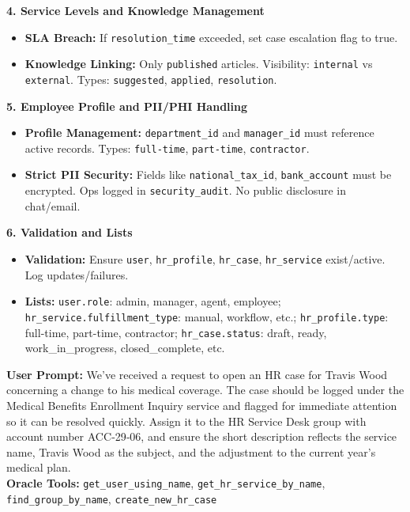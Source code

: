 \begin{taskbox}
\textbf{4. Service Levels and Knowledge Management}

\begin{itemize}
    \item \textbf{SLA Breach:} If \texttt{resolution\_time} exceeded, set case escalation flag to true.
    \item \textbf{Knowledge Linking:} Only \texttt{published} articles. Visibility: \texttt{internal} vs \texttt{external}. Types: \texttt{suggested}, \texttt{applied}, \texttt{resolution}.
\end{itemize}

\textbf{5. Employee Profile and PII/PHI Handling}

\begin{itemize}
    \item \textbf{Profile Management:} \texttt{department\_id} and \texttt{manager\_id} must reference active records. Types: \texttt{full-time}, \texttt{part-time}, \texttt{contractor}.
    \item \textbf{Strict PII Security:} Fields like \texttt{national\_tax\_id}, \texttt{bank\_account} must be encrypted. Ops logged in \texttt{security\_audit}. No public disclosure in chat/email.
\end{itemize}

\textbf{6. Validation and Lists}

\begin{itemize}
    \setlength\itemsep{0em}
    \item \textbf{Validation:} Ensure \texttt{user}, \texttt{hr\_profile}, \texttt{hr\_case}, \texttt{hr\_service} exist/active. Log updates/failures.
    \item \textbf{Lists:} \texttt{user.role}: admin, manager, agent, employee; \texttt{hr\_service.fulfillment\_type}: manual, workflow, etc.; \texttt{hr\_profile.type}: full-time, part-time, contractor; \texttt{hr\_case.status}: draft, ready, work\_in\_progress, closed\_complete, etc.
\end{itemize}

\textbf{User Prompt:} We’ve received a request to open an HR case for Travis Wood concerning a change to his medical coverage. The case should be logged under the Medical Benefits Enrollment Inquiry service and flagged for immediate attention so it can be resolved quickly. Assign it to the HR Service Desk group with account number ACC‑29‑06, and ensure the short description reflects the service name, Travis Wood as the subject, and the adjustment to the current year’s medical plan.\\

\textbf{Oracle Tools:} \texttt{get\_user\_using\_name}, \texttt{get\_hr\_service\_by\_name}, \texttt{find\_group\_by\_name}, \texttt{create\_new\_hr\_case}
\end{taskbox}

